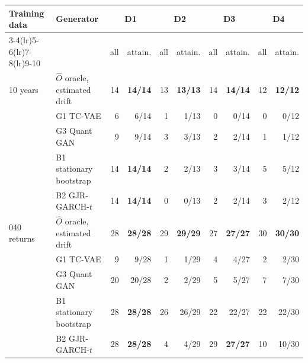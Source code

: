 \begin{tabular}{llrrrrrrrr}
\toprule
Training data & Generator & \multicolumn{2}{c}{D1} & \multicolumn{2}{c}{D2} & \multicolumn{2}{c}{D3} & \multicolumn{2}{c}{D4} \\
\cmidrule(lr){3-4}\cmidrule(lr){5-6}\cmidrule(lr){7-8}\cmidrule(lr){9-10}
& & all & attain. & all & attain. & all & attain. & all & attain. \\
\midrule
10 years & $\hat{O}$ oracle, estimated drift & 14 & \textbf{14/14} & 13 & \textbf{13/13} & 14 & \textbf{14/14} & 12 & \textbf{12/12} \\
 & G1 TC-VAE & 6 & 6/14 & 1 & 1/13 & 0 & 0/14 & 0 & 0/12 \\
 & G3 Quant GAN & 9 & 9/14 & 3 & 3/13 & 2 & 2/14 & 1 & 1/12 \\
 & B1 stationary bootstrap & 14 & \textbf{14/14} & 2 & 2/13 & 3 & 3/14 & 5 & 5/12 \\
 & B2 GJR-GARCH-$t$ & 14 & \textbf{14/14} & 0 & 0/13 & 2 & 2/14 & 3 & 2/12 \\
\addlinespace
151{,}040 returns & $\hat{O}$ oracle, estimated drift & 28 & \textbf{28/28} & 29 & \textbf{29/29} & 27 & \textbf{27/27} & 30 & \textbf{30/30} \\
 & G1 TC-VAE & 9 & 9/28 & 1 & 1/29 & 4 & 4/27 & 2 & 2/30 \\
 & G3 Quant GAN & 20 & 20/28 & 2 & 2/29 & 5 & 5/27 & 7 & 7/30 \\
 & B1 stationary bootstrap & 28 & \textbf{28/28} & 26 & 26/29 & 22 & 22/27 & 22 & 22/30 \\
 & B2 GJR-GARCH-$t$ & 28 & \textbf{28/28} & 4 & 4/29 & 29 & \textbf{27/27} & 10 & 10/30 \\
\bottomrule
\end{tabular}
